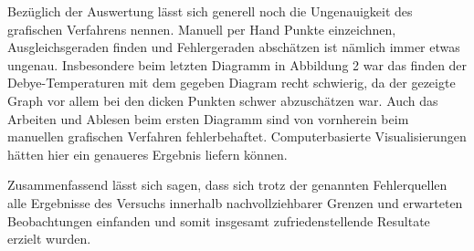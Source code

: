 \documentclass{article}
\begin{document}
Bezüglich der Auswertung lässt sich generell noch die Ungenauigkeit des grafischen Verfahrens nennen. Manuell per Hand Punkte einzeichnen, Ausgleichsgeraden finden und Fehlergeraden abschätzen ist nämlich immer etwas ungenau. Insbesondere beim letzten Diagramm in Abbildung 2 war das finden der Debye-Temperaturen mit dem gegeben Diagram recht schwierig, da der gezeigte Graph vor allem bei den dicken Punkten schwer abzuschätzen war. Auch das Arbeiten und Ablesen beim ersten Diagramm sind von vornherein beim manuellen grafischen Verfahren fehlerbehaftet. Computerbasierte Visualisierungen hätten hier ein genaueres Ergebnis liefern können.

Zusammenfassend lässt sich sagen, dass sich trotz der genannten Fehlerquellen alle Ergebnisse des Versuchs innerhalb nachvollziehbarer Grenzen und erwarteten Beobachtungen einfanden und somit insgesamt zufriedenstellende Resultate erzielt wurden.
\end{document}
